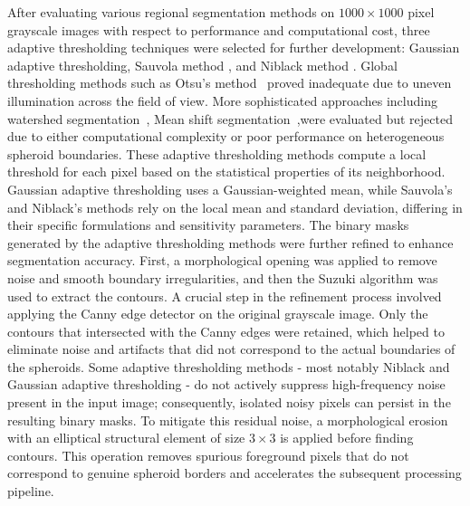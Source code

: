\documentclass[preprint,12pt]{elsarticle}
\begin{document}
After evaluating various regional segmentation methods on $1000 \times 1000$ pixel grayscale images with respect to performance and computational cost, three adaptive thresholding techniques were selected for further development: Gaussian adaptive thresholding, Sauvola method \cite{2000sauvola}, and Niblack method \cite{1985niblack}. Global thresholding methods such as Otsu's method~\cite{Otsu1979} proved inadequate due to uneven illumination across the field of view. More sophisticated approaches including watershed segmentation~\cite{Vincent1991}, Mean shift segmentation~\cite{Comaniciu2002},were evaluated but rejected due to either computational complexity or poor performance on heterogeneous spheroid boundaries. These adaptive thresholding methods compute a local threshold for each pixel based on the statistical properties of its neighborhood. Gaussian adaptive thresholding uses a Gaussian-weighted mean, while Sauvola's and Niblack's methods rely on the local mean and standard deviation, differing in their specific formulations and sensitivity parameters. The binary masks generated by the adaptive thresholding methods were further refined to enhance segmentation accuracy. First, a morphological opening was applied to remove noise and smooth boundary irregularities, and then the Suzuki algorithm \cite{1985suzuki} was used to extract the contours. A crucial step in the refinement process involved applying the Canny edge detector \cite{1986canny} on the original grayscale image. Only the contours that intersected with the Canny edges were retained, which helped to eliminate noise and artifacts that did not correspond to the actual boundaries of the spheroids. Some adaptive thresholding methods - most notably Niblack and Gaussian adaptive thresholding - do not actively suppress high-frequency noise present in the input image; consequently, isolated noisy pixels can persist in the resulting binary masks. To mitigate this residual noise, a morphological erosion with an elliptical structural element of size \(3 \times 3\) is applied before finding contours. This operation removes spurious foreground pixels that do not correspond to genuine spheroid borders and accelerates the subsequent processing pipeline.
\end{document}
